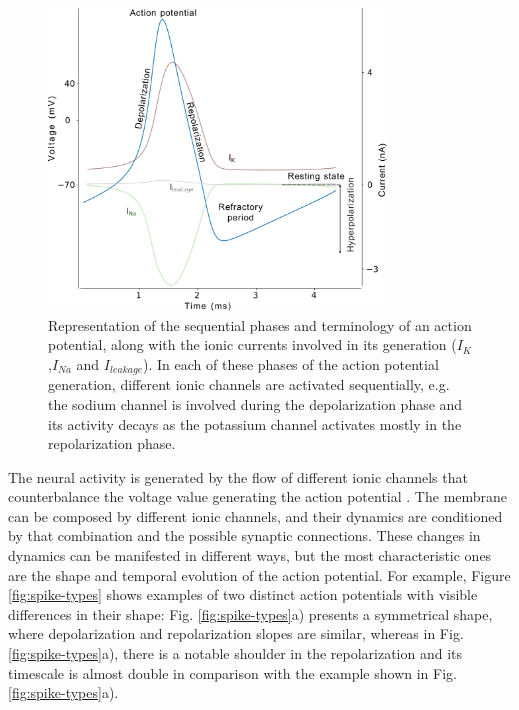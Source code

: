 \begin{figure}[htb!]
    \centering
    \includegraphics[width=0.8\textwidth]{img/intro/action_potential.pdf}
    \caption{Representation of the sequential phases and terminology of an action potential, along with the ionic currents involved in its generation ($I_K$,$I_{Na}$ and $I_{leakage}$). In each of these phases of the action potential generation, different ionic channels are activated sequentially, e.g. the sodium channel is involved during the depolarization phase and its activity decays as the potassium channel activates mostly in the repolarization phase. }
    \label{fig:action potential}
\end{figure}

The neural activity is generated by the flow of different ionic channels that counterbalance the voltage value generating the action potential \parencite{koch_biophysics_1999}. The membrane can be composed by different ionic channels, and their dynamics are conditioned by that combination and the possible synaptic connections. These changes in dynamics can be manifested in different ways, but the most characteristic ones are the shape and temporal evolution of the action potential. %
For example, Figure \ref{fig:spike-types} shows examples of two distinct action potentials with visible differences in their shape: Fig. \ref{fig:spike-types}a) presents a symmetrical shape, where depolarization and repolarization slopes are similar, whereas in Fig. \ref{fig:spike-types}a), there is a notable shoulder in the repolarization and its timescale is almost double in comparison with the example shown in Fig.\ref{fig:spike-types}a).

